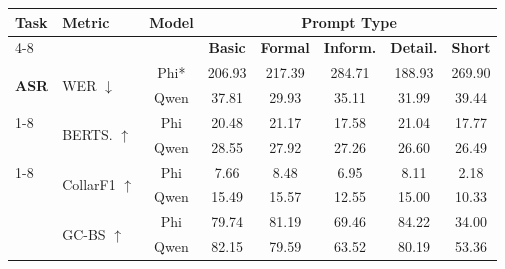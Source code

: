 
\begin{table}[]
    \centering
    \footnotesize
    \begin{tabular}{llcccccc}
     \toprule
     \multirow{2}{*}{\textbf{Task}} & \multirow{2}{*}{\textbf{Metric}} & \multirow{2}{*}{\textbf{Model}} & \multicolumn{5}{c}{\textbf{Prompt Type}} \\
     \cmidrule(lr){4-8}
     &&& \textbf{Basic} & \textbf{Formal} & \textbf{Inform.} & \textbf{Detail.} & \textbf{Short} \\
     \midrule
     \multirow{2}{*}{\textbf{ASR}} & \multirow{2}{*}{WER $\downarrow$} & Phi* & \cellcolor{taskgreen!0} 206.93 & \cellcolor{taskgreen!0} 217.39 & \cellcolor{taskgreen!0} 284.71 & \cellcolor{taskgreen!0} 188.93 & \cellcolor{taskgreen!0} 269.90 \\
      &  & Qwen & \cellcolor{taskgreen!30} 37.81 & \cellcolor{taskgreen!80} 29.93 & \cellcolor{taskgreen!47} 35.11 & \cellcolor{taskgreen!67} 31.99 & \cellcolor{taskgreen!20} 39.44 \\
     \cmidrule(lr){1-8}
     \multirow{2}{*}{\textbf{SQA}} & \multirow{2}{*}{BERTS. $\uparrow$} & Phi & \cellcolor{taskblue!0} 20.48 & \cellcolor{taskblue!0} 21.17 & \cellcolor{taskblue!0} 17.58 & \cellcolor{taskblue!0} 21.04 & \cellcolor{taskblue!0} 17.77 \\
      &  & Qwen & \cellcolor{taskblue!80} 28.55 & \cellcolor{taskblue!62} 27.92 & \cellcolor{taskblue!42} 27.26 & \cellcolor{taskblue!23} 26.60 & \cellcolor{taskblue!20} 26.49 \\
     \cmidrule(lr){1-8}
     \multirow{4}{*}{\textbf{ACHAP}} & \multirow{2}{*}{CollarF1 $\uparrow$} & Phi & \cellcolor{taskgreen!0} 7.66 & \cellcolor{taskgreen!0} 8.48 & \cellcolor{taskgreen!0} 6.95 & \cellcolor{taskgreen!0} 8.11 & \cellcolor{taskgreen!0} 2.18 \\
      &  & Qwen & \cellcolor{taskgreen!79} 15.49 & \cellcolor{taskgreen!80} 15.57 & \cellcolor{taskgreen!45} 12.55 & \cellcolor{taskgreen!73} 15.00 & \cellcolor{taskgreen!20} 10.33 \\
      & \multirow{2}{*}{GC-BS $\uparrow$} & Phi & \cellcolor{taskgreen!75} 79.74 & \cellcolor{taskgreen!78} 81.19 & \cellcolor{taskgreen!54} 69.46 & \cellcolor{taskgreen!84} 84.22 & \cellcolor{taskgreen!0} 34.00 \\
      &  & Qwen & \cellcolor{taskgreen!80} 82.15 & \cellcolor{taskgreen!75} 79.59 & \cellcolor{taskgreen!41} 63.52 & \cellcolor{taskgreen!76} 80.19 & \cellcolor{taskgreen!20} 53.36 \\

\end{tabular}
\end{table}
